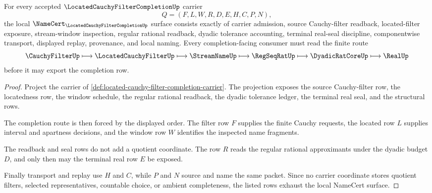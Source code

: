 \begin{theorem}
\label{thm:located-cauchy-filter-completion-namecert-obligations}
For every accepted $\LocatedCauchyFilterCompletionUp$ carrier
$$
Q=(F,L,W,R,D,E,H,C,P,N),
$$
the local $\NameCert_{\LocatedCauchyFilterCompletionUp}$ surface consists exactly of carrier admission, source Cauchy-filter readback, located-filter exposure, stream-window inspection, regular rational readback, dyadic tolerance accounting, terminal real-seal discipline, componentwise transport, displayed replay, provenance, and local naming. Every completion-facing consumer must read the finite route
$$
\CauchyFilterUp \longmapsto \LocatedCauchyFilterUp \longmapsto \StreamNameUp \longmapsto \RegSeqRatUp \longmapsto \DyadicRatCoreUp \longmapsto \RealUp
$$
before it may export the completion row.
\end{theorem}
\begin{proof}
Project the carrier of \autoref{def:located-cauchy-filter-completion-carrier}. The projection exposes the source Cauchy-filter row, the locatedness row, the window schedule, the regular rational readback, the dyadic tolerance ledger, the terminal real seal, and the structural rows.

The completion route is then forced by the displayed order. The filter row $F$ supplies the finite Cauchy requests, the located row $L$ supplies interval and apartness decisions, and the window row $W$ identifies the inspected name fragments.

The readback and seal rows do not add a quotient coordinate. The row $R$ reads the regular rational approximants under the dyadic budget $D$, and only then may the terminal real row $E$ be exposed.

Finally transport and replay use $H$ and $C$, while $P$ and $N$ source and name the same packet. Since no carrier coordinate stores quotient filters, selected representatives, countable choice, or ambient completeness, the listed rows exhaust the local NameCert surface.
\end{proof}

